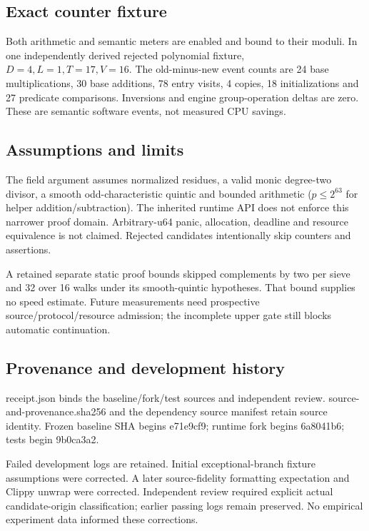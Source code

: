 \documentclass[11pt]{article}
\begin{document}
\subsection*{Exact counter fixture}
Both arithmetic and semantic meters are enabled and bound to their moduli. In one independently derived rejected polynomial fixture, $D=4,L=1,T=17,V=16$. The old-minus-new event counts are 24 base multiplications, 30 base additions, 78 entry visits, 4 copies, 18 initializations and 27 predicate comparisons. Inversions and engine group-operation deltas are zero. These are semantic software events, not measured CPU savings.
\subsection*{Assumptions and limits}
The field argument assumes normalized residues, a valid monic degree-two divisor, a smooth odd-characteristic quintic and bounded arithmetic ($p\leq2^{63}$ for helper addition/subtraction). The inherited runtime API does not enforce this narrower proof domain. Arbitrary-u64 panic, allocation, deadline and resource equivalence is not claimed. Rejected candidates intentionally skip counters and assertions.\par
A retained separate static proof bounds skipped complements by two per sieve and 32 over 16 walks under its smooth-quintic hypotheses. That bound supplies no speed estimate. Future measurements need prospective source/protocol/resource admission; the incomplete upper gate still blocks automatic continuation.
\subsection*{Provenance and development history}
receipt.json binds the baseline/fork/test sources and independent review. source-and-provenance.sha256 and the dependency source manifest retain source identity. Frozen baseline SHA begins e71e9cf9; runtime fork begins 6a8041b6; tests begin 9b0ca3a2.\par
Failed development logs are retained. Initial exceptional-branch fixture assumptions were corrected. A later source-fidelity formatting expectation and Clippy unwrap were corrected. Independent review required explicit actual candidate-origin classification; earlier passing logs remain preserved. No empirical experiment data informed these corrections.
\end{document}
